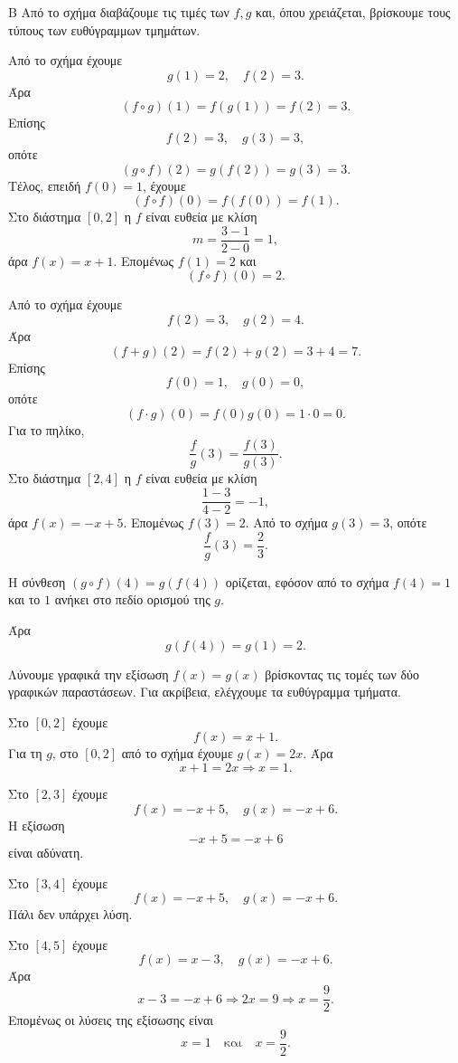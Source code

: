 

\begin{thema}{Β}
Από το σχήμα διαβάζουμε τις τιμές των $f,g$ και, όπου χρειάζεται, βρίσκουμε τους τύπους των ευθύγραμμων τμημάτων.

\begin{erwthma}
\item Από το σχήμα έχουμε
\[
g(1)=2,\quad f(2)=3.
\]
Άρα
\[
(f\circ g)(1)=f(g(1))=f(2)=3.
\]
Επίσης
\[
f(2)=3,\quad g(3)=3,
\]
οπότε
\[
(g\circ f)(2)=g(f(2))=g(3)=3.
\]
Τέλος, επειδή $f(0)=1$, έχουμε
\[
(f\circ f)(0)=f(f(0))=f(1).
\]
Στο διάστημα $[0,2]$ η $f$ είναι ευθεία με κλίση
\[
m=\frac{3-1}{2-0}=1,
\]
άρα $f(x)=x+1$. Επομένως $f(1)=2$ και
\[
(f\circ f)(0)=2.
\]

\item Από το σχήμα έχουμε
\[
f(2)=3,\quad g(2)=4.
\]
Άρα
\[
(f+g)(2)=f(2)+g(2)=3+4=7.
\]
Επίσης
\[
f(0)=1,\quad g(0)=0,
\]
οπότε
\[
(f\cdot g)(0)=f(0)g(0)=1\cdot 0=0.
\]
Για το πηλίκο,
\[
\frac{f}{g}(3)=\frac{f(3)}{g(3)}.
\]
Στο διάστημα $[2,4]$ η $f$ είναι ευθεία με κλίση
\[
\frac{1-3}{4-2}=-1,
\]
άρα $f(x)=-x+5$. Επομένως $f(3)=2$. Από το σχήμα $g(3)=3$, οπότε
\[
\frac{f}{g}(3)=\frac{2}{3}.
\]

\item Η σύνθεση $(g\circ f)(4)=g(f(4))$ ορίζεται, εφόσον από το σχήμα $f(4)=1$ και το $1$ ανήκει στο πεδίο ορισμού της $g$.

Άρα
\[
g(f(4))=g(1)=2.
\]

\item Λύνουμε γραφικά την εξίσωση $f(x)=g(x)$ βρίσκοντας τις τομές των δύο γραφικών παραστάσεων. Για ακρίβεια, ελέγχουμε τα ευθύγραμμα τμήματα.

Στο $[0,2]$ έχουμε
\[
f(x)=x+1.
\]
Για τη $g$, στο $[0,2]$ από το σχήμα έχουμε $g(x)=2x$. Άρα
\[
x+1=2x \Rightarrow x=1.
\]

Στο $[2,3]$ έχουμε
\[
f(x)=-x+5,\quad g(x)=-x+6.
\]
Η εξίσωση
\[
-x+5=-x+6
\]
είναι αδύνατη.

Στο $[3,4]$ έχουμε
\[
f(x)=-x+5,\quad g(x)=-x+6.
\]
Πάλι δεν υπάρχει λύση.

Στο $[4,5]$ έχουμε
\[
f(x)=x-3,\quad g(x)=-x+6.
\]
Άρα
\[
x-3=-x+6 \Rightarrow 2x=9 \Rightarrow x=\frac{9}{2}.
\]
Επομένως οι λύσεις της εξίσωσης είναι
\[
x=1
\quad\text{και}\quad
x=\frac{9}{2}.
\]
\end{erwthma}
\end{thema}

